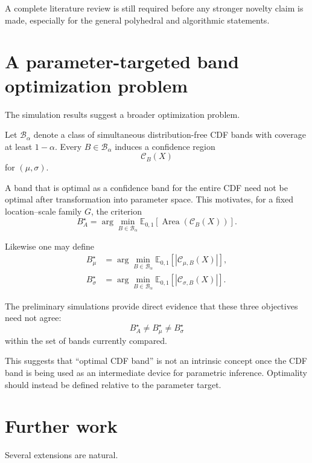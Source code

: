 \documentclass[11pt]{article}
\newcommand{\Ee}{\mathbb{E}}
\newcommand{\cC}{\mathcal{C}}
\newcommand{\cB}{\mathcal{B}}
\begin{document}
A complete literature review is still required before any stronger
novelty claim is made, especially for the general polyhedral and
algorithmic statements.


\section{A parameter-targeted band optimization problem}

The simulation results suggest a broader optimization problem.

Let $\cB_\alpha$ denote a class of simultaneous distribution-free CDF
bands with coverage at least $1-\alpha$.  Every
$B\in\cB_\alpha$ induces a confidence region
\[
    \cC_B(X)
\]
for $(\mu,\sigma)$.

A band that is optimal as a confidence band for the entire CDF need not
be optimal after transformation into parameter space.  This motivates,
for a fixed location--scale family $G$, the criterion
\begin{equation}
    B_A^\star
    =
    \arg\min_{B\in\cB_\alpha}
    \Ee_{0,1}
    \left[
        \operatorname{Area}
        \left(
            \cC_B(X)
        \right)
    \right].
    \label{eq:optarea}
\end{equation}

Likewise one may define
\begin{align}
    B_\mu^\star
    &=
    \arg\min_{B\in\cB_\alpha}
    \Ee_{0,1}
    \left[
        |\cC_{\mu,B}(X)|
    \right],
    \label{eq:optmu}
    \\
    B_\sigma^\star
    &=
    \arg\min_{B\in\cB_\alpha}
    \Ee_{0,1}
    \left[
        |\cC_{\sigma,B}(X)|
    \right].
    \label{eq:optsigma}
\end{align}

The preliminary simulations provide direct evidence that these three
objectives need not agree:
\[
    B_A^\star
    \neq
    B_\mu^\star
    \neq
    B_\sigma^\star
\]
within the set of bands currently compared.

This suggests that ``optimal CDF band'' is not an intrinsic concept
once the CDF band is being used as an intermediate device for
parametric inference.  Optimality should instead be defined relative to
the parameter target.


\section{Further work}

Several extensions are natural.
\end{document}
